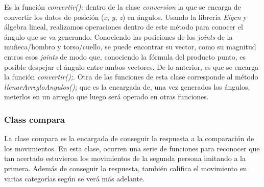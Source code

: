 \documentclass[letterpaper]{article}
\begin{document}
Es la función \textit{convertir();} dentro de la clase \textit{conversion} la que se encarga de convertir los datos de posición (\textit{x}, \textit{y}, \textit{z}) en ángulos. Usando la librería \textit{Eigen} y álgebra lineal, realizamos operaciones dentro
de este método para conocer el ángulo que se va generando. Conociendo las posiciones de los \textit{joints} de la muñeca/hombro y torso/cuello, se puede encontrar su vector, como su magnitud entros esos \textit{joints} de modo que, conociendo la fórmula del producto punto, es posible despejar el ángulo entre ambos vectores.
De lo anterior, es que se encarga la función \textit{convertir();}. Otra de las funciones de esta clase corresponde al método \textit{llenarArregloAngulos();} que es la encargada de, una vez generados los ángulos, meterlos en un arreglo que luego será operado en otras funciones. 

\subsubsection{Class compara}

\quad \quad La clase compara es la encargada de conseguir la respuesta a la comparación de los movimientos. En esta clase, ocurren una serie de funciones para reconocer que tan acertado estuvieron los movimientos de la segunda persona 
imitando a la primera. Además de conseguir la respuesta, también califica el movimiento en varias categorías según se verá más adelante.\\
\end{document}
